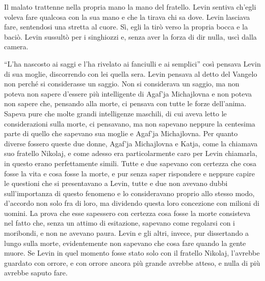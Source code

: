 Il malato trattenne nella propria mano la mano del fratello. Levin sentiva ch'egli voleva fare qualcosa con la sua mano e che la tirava chi sa dove. Levin lasciava fare, sentendosi una stretta al cuore. Sì, egli la tirò verso la propria bocca e la baciò. Levin sussultò per i singhiozzi e, senza aver la forza di dir nulla, uscì dalla camera. 

``L'ha nascosto ai saggi e l'ha rivelato ai fanciulli e ai semplici'' così pensava Levin di sua moglie, discorrendo con lei quella sera. Levin pensava al detto del Vangelo non perché si considerasse un saggio. Non si considerava un saggio, ma non poteva non sapere d'essere più intelligente di Agaf'ja Michajlovna e non poteva non sapere che, pensando alla morte, ci pensava con tutte le forze dell'anima. Sapeva pure che molte grandi intelligenze maschili, di cui aveva letto le considerazioni sulla morte, ci pensavano, ma non sapevano neppure la centesima parte di quello che sapevano sua moglie e Agaf'ja Michajlovna. Per quanto diverse fossero queste due donne, Agaf'ja Michajlovna e Katja, come la chiamava suo fratello Nikolaj, e come adesso era particolarmente caro per Levin chiamarla, in questo erano perfettamente simili. Tutte e due sapevano con certezza che cosa fosse la vita e cosa fosse la morte, e pur senza saper rispondere e neppure capire le questioni che si presentavano a Levin, tutte e due non avevano dubbi sull'importanza di questo fenomeno e lo consideravano proprio allo stesso modo, d'accordo non solo fra di loro, ma dividendo questa loro concezione con milioni di uomini. La prova che esse sapessero con certezza cosa fosse la morte consisteva nel fatto che, senza un attimo di esitazione, sapevano come regolarsi con i moribondi, e non ne avevano paura. Levin e gli altri, invece, pur dissertando a lungo sulla morte, evidentemente non sapevano che cosa fare quando la gente muore. Se Levin in quel momento fosse stato solo con il fratello Nikolaj, l'avrebbe guardato con orrore, e con orrore ancora più grande avrebbe atteso, e nulla di più avrebbe saputo fare. 

